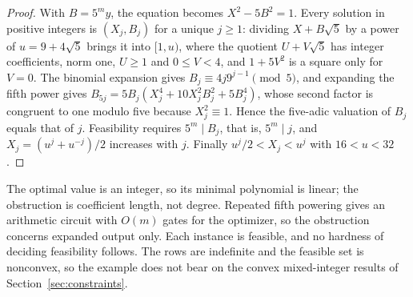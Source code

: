 \begin{proof}
With $B=5^my$, the equation becomes $X^2-5B^2=1$. Every solution in positive
integers is $(X_j,B_j)$ for a unique $j\ge1$: dividing $X+B\sqrt5$ by a power of
$u=9+4\sqrt5$ brings it into $[1,u)$, where the quotient $U+V\sqrt5$ has
integer coefficients, norm one, $U\ge1$ and $0\le V<4$, and $1+5V^2$ is a
square only for $V=0$. The binomial expansion gives
$B_j\equiv4j9^{j-1}\pmod5$, and expanding the fifth power gives
$B_{5j}=5B_j(X_j^4+10X_j^2B_j^2+5B_j^4)$, whose second factor is congruent to
one modulo five because $X_j^2\equiv1$. Hence the five-adic valuation of
$B_j$ equals that of $j$. Feasibility requires $5^m\mid B_j$, that is,
$5^m\mid j$, and $X_j=(u^j+u^{-j})/2$ increases with $j$. Finally
$u^j/2<X_j<u^j$ with $16<u<32$.
\end{proof}

The optimal value is an integer, so its minimal polynomial is linear; the
obstruction is coefficient length, not degree. Repeated fifth powering gives
an arithmetic circuit with $O(m)$ gates for the optimizer, so the obstruction
concerns expanded output only. Each instance is feasible, and no hardness of
deciding feasibility follows. The rows are indefinite and the feasible set is
nonconvex, so the example does not bear on the convex mixed-integer results
of Section~\ref{sec:constraints}.
